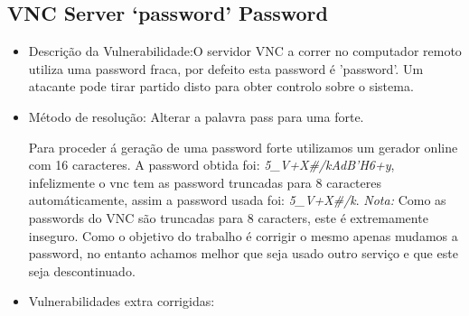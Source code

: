 \subsection{VNC Server ‘password’ Password}

\begin{itemize}
\item Descrição da Vulnerabilidade:O servidor VNC a correr no computador remoto utiliza uma password fraca, por defeito esta password é 'password'. Um atacante pode tirar partido disto para obter controlo sobre o sistema.

\item Método de resolução: Alterar a palavra pass para uma forte.
\par Para proceder á geração de uma password forte utilizamos um gerador online com 16 caracteres. A password obtida foi: \textit{5\_V+X\#/kAdB'H6+y}, infelizmente o vnc tem as password truncadas para 8 caracteres automáticamente, assim a password usada foi: \textit{5\_V+X\#/k}.\newline
\textit{Nota:} Como as passwords do VNC são truncadas para 8 caracters, este é extremamente inseguro. Como o objetivo do trabalho é corrigir o mesmo apenas mudamos a password, no entanto achamos melhor que seja usado outro serviço e que este seja descontinuado.

\item Vulnerabilidades extra corrigidas:
\end{itemize}
